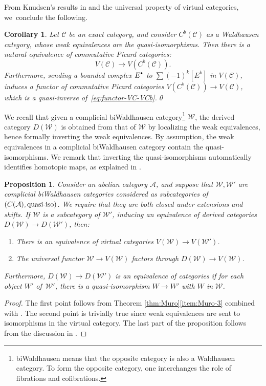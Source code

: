 \documentclass[11pt]{article}
\newcommand{\sbullet}{{\scriptscriptstyle\bullet}}
\newcommand{\csbullet}{{\raisebox{1pt}{$\sbullet$}}}
\theoremstyle{plain}
\newtheorem{proposition}[theorem]{Proposition}
\newtheorem{corollary}[theorem]{Corollary}
\theoremstyle{definition}
\newcommand{\Acal}{\mathcal A}
\newcommand{\Ccal}{\mathcal C}
\newcommand{\Wcal}{\mathcal W}
\begin{document}
From Knudsen's results in \cite{Knudsen} and the universal property of virtual categories, we~conclude the following.
\begin{corollary}\label{cor:equivalence-virtual-C-Cb}
Let $\Ccal$ be an exact category, and consider $C^{b}(\Ccal)$ as a Waldhausen category, whose weak equivalences are the quasi-isomorphisms. Then there is a natural equivalence of commutative Picard categories:
\begin{equation}\label{eq:functor-VC-VCb}
V(\Ccal) \to V(C^b(\Ccal)).
\end{equation}
Furthermore, sending a bounded complex $E^{\csbullet}$ to $\sum (-1)^{k}[E^{k}]$ in $V(\Ccal)$, induces a functor of commutative Picard categories $V(C^{b}(\Ccal))\to V(\Ccal)$, which is a quasi-inverse of~\eqref{eq:functor-VC-VCb}.\qed
\end{corollary}

We recall that given a complicial biWaldhausen category\footnote{biWaldhausen means that the opposite category is also a Waldhausen category. To form the opposite category, one interchanges the role of fibrations and cofibrations.} $\Wcal$, the derived category $D(\Wcal)$ is obtained from that of $\Wcal$ by localizing the weak equivalences, hence formally inverting the weak equivalences. By assumption, the weak equivalences in a complicial biWaldhausen category contain the quasi-isomorphisms. We remark that inverting the quasi-isomorphisms automatically identifies homotopic maps, as explained in \cite[.6]{ThomasonTrobaugh}.

\begin{proposition}\label{prop:derivedvirtual}
Consider an abelian category $\Acal$, and suppose that $\Wcal, \Wcal'$ are complicial biWaldhausen categories considered as subcategories of $(C(\Acal), \hbox{quasi-iso})$. We require that they are both closed under extensions and shifts. If $\Wcal$ is a subcategory of $\Wcal'$, inducing an equivalence of derived categories $D(\Wcal) \to D(\Wcal')$, then:

\begin{enumerate}
\item There is an equivalence of virtual categories $V(\Wcal)\to V(\Wcal')$.
\item The universal functor $\Wcal \to V(\Wcal)$ factors through $D(\Wcal)\to V(\Wcal)$.
\end{enumerate}
Furthermore, $D(\Wcal) \to D(\Wcal')$ is an equivalence of categories if for each object $W'$ of~$\Wcal'$, there is a quasi-isomorphism $W \to W'$ with $W$ in $\Wcal$.

\end{proposition}
\begin{proof}
The first point follows from Theorem \ref{thm:Muro}\eqref{item:Muro-3} combined with \cite[Th.\,1.9.8 \& Ex.\,1.3.6]{ThomasonTrobaugh}. The second point is trivially true since weak equivalences are sent to isomorphisms in the virtual category. The last part of the proposition follows from the discussion in \cite[.7]{ThomasonTrobaugh}.
\end{proof}
\end{document}

